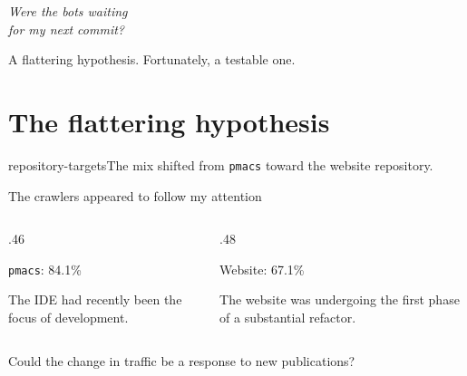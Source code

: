 \documentclass[aspectratio=169,11pt]{beamer}
\begin{document}
{\CQuiet
\begin{frame}[plain]
  \centering{}\bigskip
  {\fontsize{27}{32}\selectfont\itshape
    Were the bots waiting\\for my next commit?\par}
  \bigskip\bigskip
  {\large A flattering hypothesis. Fortunately, a testable one.\par}
\end{frame}}

\section{The flattering hypothesis}
  {repository-targets}{The mix shifted from \texttt{pmacs} toward the website repository.}

\begin{frame}{The crawlers appeared to follow my attention}
  \begin{columns}[T,onlytextwidth]
    \begin{column}{.46\textwidth}
      {\Large \texttt{pmacs}: 84.1\%\par}\medskip
      The IDE had recently been the focus of development.
    \end{column}
    \begin{column}{.48\textwidth}
      {\Large Website: 67.1\%\par}\medskip
      The website was undergoing the first phase of a substantial refactor.
    \end{column}
  \end{columns}
  \bigskip\bigskip
  {\large Could the change in traffic be a response to new publications?\par}
  \medskip{}
\end{frame}
\end{document}

